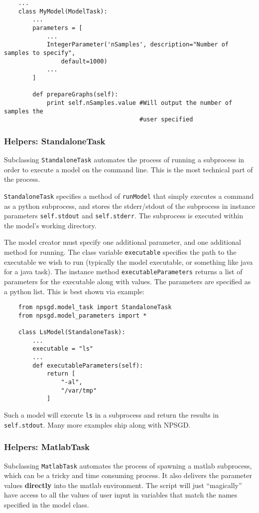 \documentclass{article}
\newcommand{\mclass}[1]{\texttt{#1}}
\begin{document}
\begin{lstlisting}
    ...
    class MyModel(ModelTask):
        ...
        parameters = [
            ...
            IntegerParameter('nSamples', description="Number of samples to specify",
                default=1000)
            ...
        ]

        def prepareGraphs(self):
            print self.nSamples.value #Will output the number of samples the
                                      #user specified

\end{lstlisting}

\subsubsection{Helpers: StandaloneTask}
Subclassing \mclass{StandaloneTask} automates the process of running a
subprocess in order to execute a model on the command line. This is the most
technical part of the process.

\mclass{StandaloneTask} specifies a method of \texttt{runModel} that simply
executes a command as a python subprocess, and stores the stderr/stdout of the
subprocess in instance parameters \texttt{self.stdout} and \texttt{self.stderr}.
The subprocess is executed within the model's working directory. 

The model creator must specify one additional parameter, and one additional
method for running. The class variable \texttt{executable} specifies the path to
the executable we wish to run (typically the model executable, or something like
java for a java task). The instance method \texttt{executableParameters} returns
a list of parameters for the executable along with values. The parameters are
specified as a python list. This is best shown via example:

\begin{lstlisting}
    from npsgd.model_task import StandaloneTask
    from npsgd.model_parameters import *

    class LsModel(StandaloneTask):
        ...
        executable = "ls"
        ...
        def executableParameters(self):
            return [
                "-al",
                "/var/tmp"
            ]
\end{lstlisting}

Such a model will execute \texttt{ls} in a subprocess and return the results in
\texttt{self.stdout}. Many more examples ship along with NPSGD.

\subsubsection{Helpers: MatlabTask}
Subclassing \mclass{MatlabTask} automates the process of spawning a matlab
subprocess, which can be a tricky and time consuming process. It also delivers
the parameter values \textbf{directly} into the matlab environment. The script
will just ``magically'' have access to all the values of user input in variables
that match the names specified in the model class. 
\end{document}
